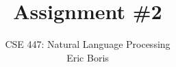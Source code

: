 \title{Assignment \#2} 
\author{\normalsize{CSE 447: Natural Language Processing}\\ 
\normalsize{Eric Boris}}
\maketitle
